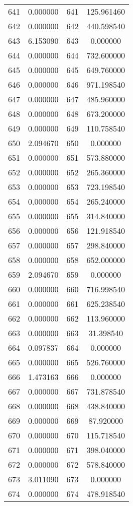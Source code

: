 \documentclass[12pt]{article}
\begin{document}
\begin{longtable}{@{}cccc@{}}
641 & 0.000000 & 641 & 125.961460 \\
642 & 0.000000 & 642 & 440.598540 \\
643 & 6.153090 & 643 & 0.000000 \\
644 & 0.000000 & 644 & 732.600000 \\
645 & 0.000000 & 645 & 649.760000 \\
646 & 0.000000 & 646 & 971.198540 \\
647 & 0.000000 & 647 & 485.960000 \\
648 & 0.000000 & 648 & 673.200000 \\
649 & 0.000000 & 649 & 110.758540 \\
650 & 2.094670 & 650 & 0.000000 \\
651 & 0.000000 & 651 & 573.880000 \\
652 & 0.000000 & 652 & 265.360000 \\
653 & 0.000000 & 653 & 723.198540 \\
654 & 0.000000 & 654 & 265.240000 \\
655 & 0.000000 & 655 & 314.840000 \\
656 & 0.000000 & 656 & 121.918540 \\
657 & 0.000000 & 657 & 298.840000 \\
658 & 0.000000 & 658 & 652.000000 \\
659 & 2.094670 & 659 & 0.000000 \\
660 & 0.000000 & 660 & 716.998540 \\
661 & 0.000000 & 661 & 625.238540 \\
662 & 0.000000 & 662 & 113.960000 \\
663 & 0.000000 & 663 & 31.398540 \\
664 & 0.097837 & 664 & 0.000000 \\
665 & 0.000000 & 665 & 526.760000 \\
666 & 1.473163 & 666 & 0.000000 \\
667 & 0.000000 & 667 & 731.878540 \\
668 & 0.000000 & 668 & 438.840000 \\
669 & 0.000000 & 669 & 87.920000 \\
670 & 0.000000 & 670 & 115.718540 \\
671 & 0.000000 & 671 & 398.040000 \\
672 & 0.000000 & 672 & 578.840000 \\
673 & 3.011090 & 673 & 0.000000 \\
674 & 0.000000 & 674 & 478.918540 \\

\end{longtable}
\end{document}
